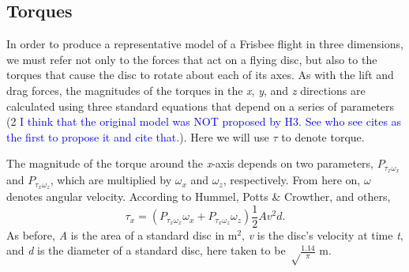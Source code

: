 \documentclass[a4paper,12pt, oneside]{article}
\newcommand{\red}[1]{\textcolor{red}{#1}}
\newcommand{\blue}[1]{\textcolor{blue}{#1}}
\begin{document}
\subsection{Torques}

In order to produce a representative model of a Frisbee flight in three dimensions, we must refer not only to the forces that act on a flying disc, but also to the torques that cause the disc to rotate about each of its axes. As with the lift and drag forces, the magnitudes of the torques in the \textit{x}, \textit{y}, and \textit{z} directions are calculated using three standard equations that depend on a series of parameters (2 \blue{I think that the original model was NOT proposed by H3. See who see cites as the first to propose it and cite that.}). Here we will use $\tau$ to denote torque.

The magnitude of the torque around the \textit{x}-axis depends on two parameters, $P_{\tau_x\omega_x}$ and $P_{\tau_x\omega_z}$, which are multiplied by $\omega_x$ and $\omega_z$, respectively. From here on, $\omega$ denotes angular velocity. According to Hummel, Potts \& Crowther, and others,
\begin{equation}
  \tau_x=(P_{\tau_x\omega_x}\omega_x+P_{\tau_x\omega_z}\omega_z)\frac{1}2Av^2d.
\end{equation}
As before, \textit{A} is the area of a standard disc in m$^2$, \textit{v} is the disc's velocity at time \textit{t}, and \textit{d} is the diameter of a standard disc, here taken to be $\sqrt\frac{1.14}\pi$ m.
\end{document}
